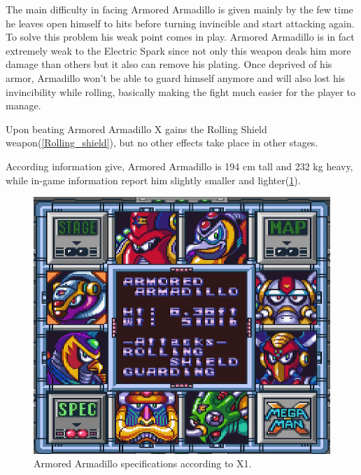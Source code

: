 The main difficulty in facing Armored Armadillo is given mainly by the few time he leaves open himself to hits before turning invincible and start attacking again. To solve this problem his weak point comes in play. Armored Armadillo is in fact extremely weak to the Electric Spark since not only this weapon deals him more damage than others but it also can remove his plating. Once deprived of his armor, Armadillo won't be able to guard himself anymore and will also lost his invincibility while rolling, basically making the fight much easier for the player to manage.

Upon beating Armored Armadillo X gains the Rolling Shield weapon(\ref{Rolling_shield}), but no other effects take place in other stages.

According information give, Armored Armadillo is 194 cm tall and 232 kg heavy, while in-game information report him slightly smaller and lighter(\ref{Armadillo_specs}).

\begin{figure}[htp]
	\centering
	\includegraphics[width=0.5\linewidth]{figures/X1/Armored_armadillo/Armored_armadillo_specs.png}
	\caption{Armored Armadillo specifications according to X1.}
	\label{Armadillo_specs}
\end{figure}

